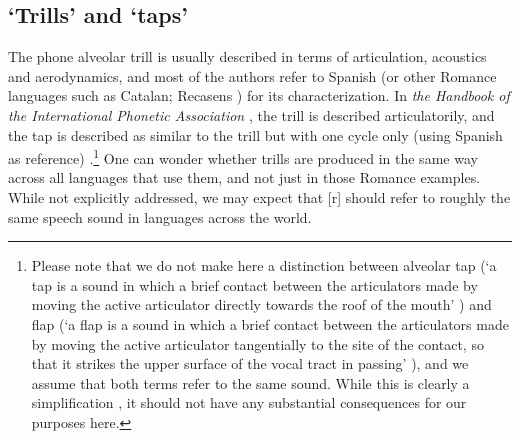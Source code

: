 \subsection{‘Trills’ and ‘taps’}\label{subsec:trill_tap}

The phone alveolar trill is usually described in terms of articulation, acoustics and aerodynamics, and most of the authors refer to Spanish (or other Romance languages such as Catalan; Recasens \parencite*{recasensProductionCharacteristicsApicoalveolar1991}) for its characterization. In \textit{the Handbook of the International Phonetic Association} \parencite{ipaHandbookInternationalPhonetic1999}, the trill is described articulatorily, and the tap is described as similar to the trill but with one cycle only (using Spanish as reference) \parencite{ipaHandbookInternationalPhonetic1999}.\footnote{Please note that we do not make here a distinction between alveolar tap (‘a tap is a sound in which a brief contact between the articulators made by moving the active articulator directly towards the roof of the mouth’ \parencite[231]{ladefogedSoundsWorldLanguages1996}) and flap (‘a flap is a sound in which a brief contact between the articulators made by moving the active articulator tangentially to the site of the contact, so that it strikes the upper surface of the vocal tract in passing’ \parencite[231]{ladefogedSoundsWorldLanguages1996}), and we assume that both terms refer to the same sound. While this is clearly a simplification \parencite{derrickIndividualVariationEnglish2011}, it should not have any substantial consequences for our purposes here.}
One can wonder whether trills are produced in the same way across all languages that use them, and not just in those Romance examples. While not explicitly addressed, we may expect that [r] should refer to roughly the same speech sound in languages across the world.


